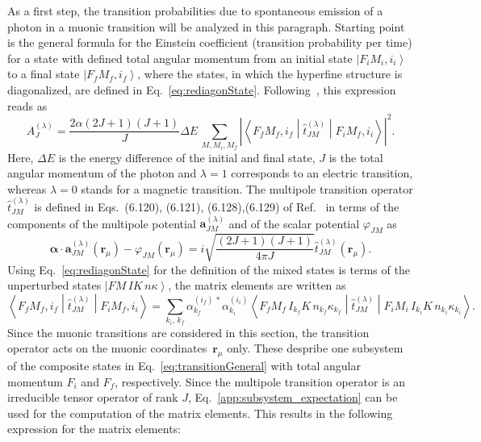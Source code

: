 As a first step, the transition probabilities due to spontaneous emission of a photon in a muonic transition will be analyzed in this paragraph. Starting point is the general formula for the Einstein coefficient (transition probability per time) for a state with defined total angular momentum from an initial state $\left|F_iM_i,i_i\right>$ to a final state $\left|F_fM_f,i_f\right>$, where the states, in which the hyperfine structure is diagonalized, are defined in Eq.~\eqref{eq:rediagonState}. Following~\cite[Section 6.]{johnson2007}, this expression reads as
\begin{equation}
\label{eq:transitionGeneral}
A^{(\lambda)}_{J}=\frac{2\alpha (2J+1)(J+1)}{J}\Delta E\,\sum_{M,M_i,M_f} \left|\left<F_fM_f,i_f\middle|\hat{t}^{(\lambda)}_{JM}\middle|F_iM_f,i_i\right>\right|^2.
\end{equation}
Here, $\Delta E$ is the energy difference of the initial and final state, $J$ is the total angular momentum of the photon and $\lambda=1$ corresponds to an electric transition, whereas $\lambda=0$ stands for a magnetic transition. The multipole transition operator $\hat{t}^{(\lambda)}_{JM}$ is defined in Eqs.~(6.120), (6.121), (6.128),(6.129) of Ref.~\cite{johnson2007} in terms of the components of the multipole potential $\mathbf{a}^{(\lambda)}_{JM}$ and of the scalar potential $\varphi_{JM}$ as
\begin{equation}
\boldsymbol{\alpha}\cdot \mathbf{a}^{(\lambda)}_{JM}(\mathbf{r}_\mu) - \varphi_{JM}(\mathbf{r}_\mu) = i\sqrt{\frac{(2J+1)(J+1)}{4\pi J}}\hat{t}^{(\lambda)}_{JM}(\mathbf{r}_\mu).
\end{equation}
Using Eq.~\eqref{eq:rediagonState} for the definition of the mixed states is terms of the unperturbed states $\left| FM\,IK\,n\kappa\right>$, the matrix elements are written as
\begin{equation}
\label{eq:tranElement1}
\left<F_fM_f,i_f\middle|\hat{t}^{(\lambda)}_{JM}\middle|F_iM_f,i_i\right> =
\sum_{k_i,\,k_f}\alpha^{(i_f)\,*}_{k_f} \alpha^{(i_i)}_{k_i}\left<F_fM_f\,I_{k_f}K\,n_{k_f}\kappa_{k_f} \middle|\hat{t}^{(\lambda)}_{JM}\middle|F_iM_i\,I_{k_i}K\,n_{k_i}\kappa_{k_i}\right>.
\end{equation}
Since the muonic transitions are considered in this section, the transition operator acts on the muonic coordinates~$\mathbf{r}_\mu$ only. These despribe one subsystem of the composite states in Eq.~\eqref{eq:transitionGeneral} with total angular momentum $F_i$ and $F_f$, respectively. Since the multipole transition operator is an irreducible tensor operator of rank $J$, Eq.~\eqref{app:subsystem_expectation} can be used for the computation of the matrix elements. This results in the following expression for the matrix elements:

